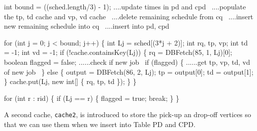 \documentclass{article}
\def\nwendcode{\endtrivlist \endgroup}
\let\nwdocspar=\par
\theoremstyle{definition}
\begin{document}
\nwendcode{}\endmoddef{}
int bound = ((sched.length/3) - 1);
\LA{}....update times in pd and cpd~{\nwtagstyle{}}\RA{}
\LA{}....populate the tp, td cache and vp, vd cache~{\nwtagstyle{}}\RA{}
\LA{}....delete remaining schedule from cq~{\nwtagstyle{}}\RA{}
\LA{}....insert new remaining schedule into cq~{\nwtagstyle{}}\RA{}
\LA{}....insert into pd, cpd~{\nwtagstyle{}}\RA{}
\nwendcode{}\nwdocspar
\nwenddocs{}\endmoddef{}
for (int j = 0; j < bound; j++) \{
  int Lj = sched[(3*j + 2)];
  int rq, tp, vp;
  int td = -1;
  int vd = -1;
  if (!cache.containsKey(Lj)) \{
    rq = DBFetch(85, 1, Lj)[0];
    boolean flagged = false;
    \LA{}......check if new job~{\nwtagstyle{}}\RA{}
    if (flagged) \{
      \LA{}......get tp, vp, td, vd of new job~{\nwtagstyle{}}\RA{}
    \} else \{
      output = DBFetch(86, 2, Lj);
      tp = output[0];
      td = output[1];
    \}
    cache.put(Lj, new int[] \{ rq, tp, td \});
  \}
\}
\nwendcode{}\nwdocspar
\nwenddocs{}\endmoddef{}
for (int r : rid) \{
  if (Lj == r) \{
    flagged = true;
    break;
  \}
\}
\nwendcode{}\nwdocspar
A second cache, {\tt{}cache2}, is introduced to store the pick-up an drop-off
vertices so that we can use them when we insert into Table PD and CPD.
\end{document}
